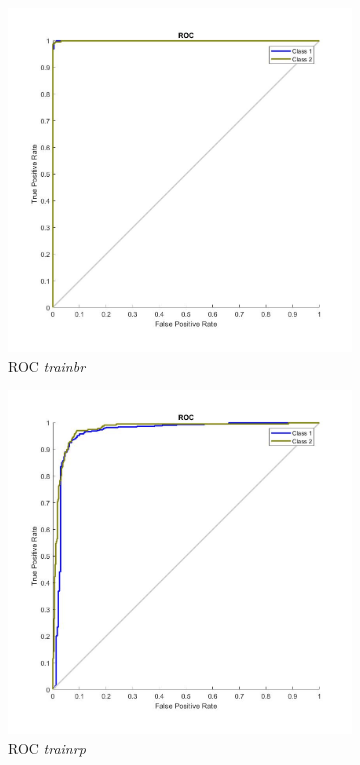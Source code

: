 \documentclass{article}
\begin{document}
\begin{figure}[H]
 \centering
 \begin{subfigure}{0.4\textwidth}
  \includegraphics[width=0.8\linewidth]{../images/I_ex4_roc_cancer_dataset_trainbr.jpg}
  \caption{ROC \textit{trainbr}}
 \end{subfigure}
 \begin{subfigure}{0.4\textwidth}
  \includegraphics[width=0.8\linewidth]{../images/I_ex4_roc_cancer_dataset_traingd.jpg}
  \caption{ROC \textit{trainrp}}
 \end{subfigure}
 \begin{subfigure}{0.4\textwidth}

\end{subfigure}
\end{figure}
\end{document}
